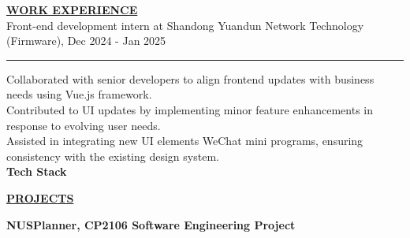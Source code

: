 \documentclass{article}
\begin{document}
\vspace{0.1cm}

\vspace{0.3cm}

\noindent \textbf{\underline{WORK EXPERIENCE}} \\ %
\hfill{Front-end development intern at Shandong Yuandun Network Technology (Firmware), \indent \indent \indent {     \indent    } Dec 2024 - Jan 2025} \\
\vspace{-0.7cm} %

\noindent\rule{\linewidth}{0.4pt} %
\indent \textbullet{} Collaborated with senior developers to align frontend updates with business needs using Vue.js framework.\\
\indent \textbullet{} Contributed to UI updates by implementing minor feature enhancements in response to evolving user needs.\\
\indent \textbullet{} Assisted in integrating new UI elements WeChat mini programs, ensuring consistency with the existing design system. \\
\textbullet{} \textbf{Tech Stack} \\
\indent {}
\vspace{0.4cm}

\noindent \textbf{\underline{PROJECTS}} \\
\vspace{-0.4cm}

\noindent \textbf{NUSPlanner, CP2106 Software Engineering Project} \\
\vspace{-0.7cm} %
\end{document}
